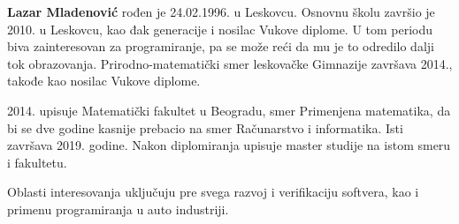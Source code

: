 \documentclass[12pt,oneside]{memoir}
\theoremstyle{plain}
\theoremstyle{definition}
\begin{document}
\literatura

\backmatter

\begin{biografija}
  \textbf{Lazar Mladenović} rođen je 24.02.1996. u Leskovcu. Osnovnu školu završio je 2010. u Leskovcu, kao đak generacije i nosilac Vukove diplome. U tom periodu biva zainteresovan za programiranje, pa se može reći da mu je to odredilo dalji tok obrazovanja. Prirodno-matematički smer leskovačke Gimnazije završava 2014., takođe kao nosilac Vukove diplome.
  
  2014. upisuje Matematički fakultet u Beogradu, smer Primenjena matematika, da bi se  dve godine kasnije prebacio na smer Računarstvo i informatika. Isti završava 2019. godine. Nakon diplomiranja upisuje master studije na istom smeru i fakultetu. 
  
  Oblasti interesovanja uključuju pre svega razvoj i verifikaciju softvera, kao i primenu programiranja u auto industriji.  
    
\end{biografija}
\end{document}
